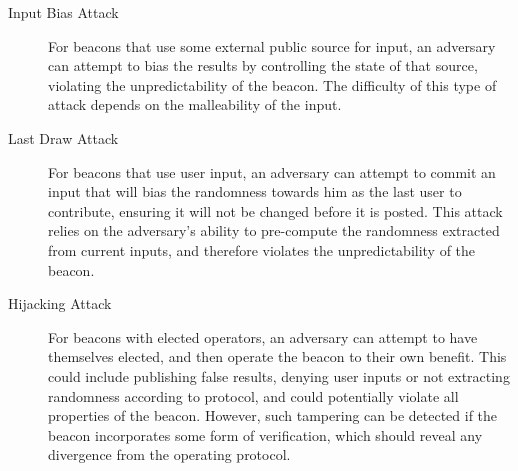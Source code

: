 \begin{description}
    \item[Input Bias Attack] For beacons that use some external public source for input, an adversary can attempt to bias the results by controlling the state of that source, violating the unpredictability of the beacon. The difficulty of this type of attack depends on the malleability of the input.
    \item[Last Draw Attack] For beacons that use user input, an adversary can attempt to commit an input that will bias the randomness towards him as the last user to contribute, ensuring it will not be changed before it is posted. This attack relies on the adversary's ability to pre-compute the randomness extracted from current inputs, and therefore violates the unpredictability of the beacon.
    \item[Hijacking Attack] For beacons with elected operators, an adversary can attempt to have themselves elected, and then operate the beacon to their own benefit. This could include publishing false results, denying user inputs or not extracting randomness according to protocol, and could potentially violate all properties of the beacon. However, such tampering can be detected if the beacon incorporates some form of verification, which should reveal any divergence from the operating protocol.

\end{description}

